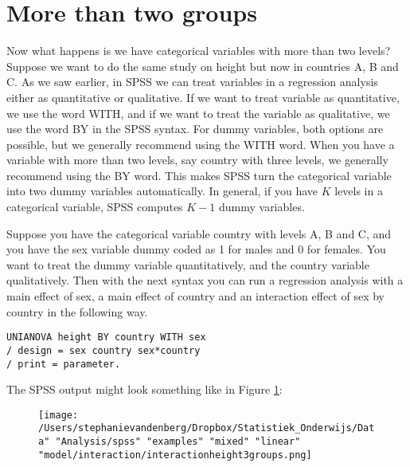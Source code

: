 \section{More than two groups}

Now what happens is we have categorical variables with more than two levels? Suppose we want to do the same study on height but now in countries A, B and C. As we saw earlier, in SPSS we can treat variables in a regression analysis either as quantitative or qualitative. If we want to treat variable as quantitative, we use the word WITH, and if we want to treat the variable as qualitative, we use the word BY in the SPSS syntax. For dummy variables, both options are possible, but we generally recommend using the WITH word. When you have a variable with more than two levels, say country with three levels, we generally recommend using the BY word. This makes SPSS turn the categorical variable into two dummy variables automatically. In general, if you have $K$ levels in a categorical variable, SPSS computes $K-1$ dummy variables.

Suppose you have the categorical variable country with levels A, B and C, and you have the sex variable dummy coded as 1 for males and 0 for females. You want to treat the dummy variable quantitatively, and the country variable qualitatively. Then with the next syntax you can run a regression analysis with a main effect of sex, a main effect of country and an interaction effect of sex by country in the following way.

\begin{verbatim}
UNIANOVA height BY country WITH sex 
/ design = sex country sex*country
/ print = parameter.
\end{verbatim}


The SPSS output might look something like in Figure \ref{fig:interactionheight3group}:


\begin{figure}[h]
    \begin{center}
       \texttt{[image: /Users/stephanievandenberg/Dropbox/Statistiek\_Onderwijs/Data" "Analysis/spss" "examples" "mixed" "linear" "model/interaction/interactionheight3groups.png]}
    \end{center}
    \label{fig:interactionheight3group}
\end{figure}

